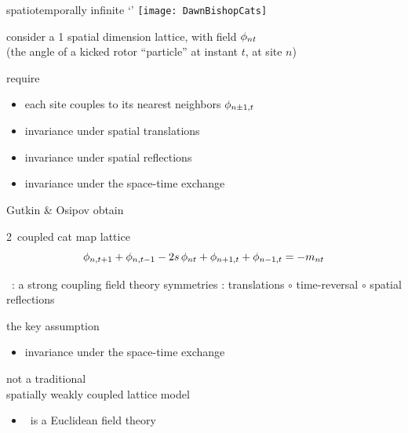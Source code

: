 \begin{frame}{spatiotemporally infinite `\catlatt'}
\hfill\texttt{[image: DawnBishopCats]}
\end{frame} %

\begin{frame}{\catlatt}
consider
a 1 {\color{blue}spatial} dimension lattice, with field
$\phi_{nt}$ \\
(the angle of a kicked
rotor ``particle'' at instant $t$, at site $n$)
\begin{block}{require}
\begin{itemize}
\item  each site couples to
its nearest neighbors $\phi_{n\pm1,t}$
\item  invariance under
spatial translations
\item  invariance under spatial reflections
\item  invariance under the space-time exchange
\end{itemize}
\end{block}

\bigskip

Gutkin \& Osipov obtain
\begin{block}{2\dmn\ coupled cat map lattice}
\[
\phi_{n,t+1} + \phi_{n,t-1} - 2s \, \phi_{n t} + \phi_{n+1,t} + \phi_{n-1, t}
     =-{m_{n t}}
\] %
\end{block}
\end{frame} %

\begin{frame}{\catlatt\ : a strong coupling field theory}
symmetries : translations $\circ$ time-reversal $\circ$ spatial reflections

\bigskip

\begin{block}{the key assumption}
\begin{itemize}
\item  invariance under the space-time exchange
\end{itemize}
\end{block}
\bigskip

{\color{red}not} a traditional \\
{\color{blue}spatially
weakly coupled} lattice model
\bigskip
%
%
%
\vfill

\begin{itemize}
  \item \catlatt\ is a Euclidean field theory
\end{itemize}
\end{frame} %

